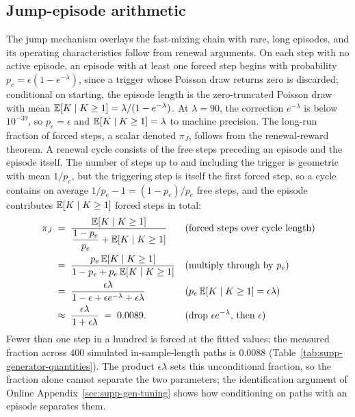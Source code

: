 \subsection{Jump-episode arithmetic}
\label{sec:supp-gen-renewal}

The jump mechanism overlays the fast-mixing chain with rare, long
episodes, and its operating characteristics follow from renewal
arguments. On each step with no active episode, an episode with at
least one forced step begins with probability
$p_e = \epsilon (1 - e^{-\lambda})$, since a trigger whose Poisson
draw returns zero is discarded; conditional on starting, the episode
length is the zero-truncated Poisson draw with mean
$\mathbb{E}[K \mid K \ge 1] = \lambda / (1 - e^{-\lambda})$. At $\lambda =
90$, the correction $e^{-\lambda}$ is below $10^{-39}$, so $p_e =
\epsilon$ and $\mathbb{E}[K \mid K \ge 1] = \lambda$ to machine precision.
The long-run fraction of forced steps, a scalar denoted $\pi_J$,
follows from the renewal-reward theorem. A renewal cycle consists of
the free steps preceding an episode and the episode itself. The number
of steps up to and including the trigger is geometric with mean
$1/p_e$, but the triggering step is itself the first forced step, so
a cycle contains on average $1/p_e - 1 = (1 - p_e)/p_e$ free steps,
and the episode contributes $\mathbb{E}[K \mid K \ge 1]$ forced steps in
total:
\begin{align}
  \pi_J
   &\;=\; \frac{\mathbb{E}[K \mid K \ge 1]}
     {\dfrac{1 - p_e}{p_e} + \mathbb{E}[K \mid K \ge 1]}
     && \text{(forced steps over cycle length)} \notag \\
   &\;=\; \frac{p_e\, \mathbb{E}[K \mid K \ge 1]}
     {1 - p_e + p_e\, \mathbb{E}[K \mid K \ge 1]}
     && \text{(multiply through by $p_e$)} \notag \\
   &\;=\; \frac{\epsilon \lambda}
     {1 - \epsilon + \epsilon e^{-\lambda} + \epsilon \lambda}
     && \text{($p_e\, \mathbb{E}[K \mid K \ge 1] = \epsilon \lambda$)} \notag \\
   &\;\approx\; \frac{\epsilon \lambda}{1 + \epsilon \lambda}
     \;=\; 0.0089.
     && \text{(drop $\epsilon e^{-\lambda}$, then $\epsilon$)}
  \label{eq:supp-rho}
\end{align}
Fewer than one step in a hundred is forced at the fitted values; the
measured fraction across $400$ simulated in-sample-length paths is
$0.0088$ (Table~\ref{tab:supp-generator-quantities}). The product
$\epsilon \lambda$ sets this unconditional fraction, so the fraction
alone cannot separate the two parameters; the identification argument
of Online Appendix~\ref{sec:supp-gen-tuning} shows how conditioning on
paths with an episode separates them.

